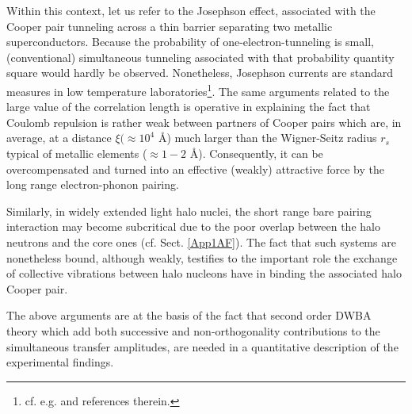 Within this context, let us refer to the Josephson effect, associated with the Cooper pair tunneling across a thin barrier separating two metallic superconductors. Because the probability of one-electron-tunneling is small, (conventional) simultaneous tunneling associated with that probability quantity square would hardly be observed. Nonetheless, Josephson currents are standard measures in low temperature laboratories\footnote{cf. e.g. \cite{Rogalla:12} and references therein.}.
The same arguments related  to the large value of the correlation length is operative in explaining the fact that Coulomb repulsion is rather weak between partners of Cooper pairs which are, in average, at a distance $\xi (\approx 10^{4}$ \AA{}) much larger than the Wigner-Seitz radius $r_s$ typical of metallic elements ($\approx 1-2$ \AA{}). Consequently, it can be overcompensated and turned into an effective (weakly) attractive force by the long range electron-phonon pairing. 


Similarly, in widely extended light halo nuclei, the short range bare pairing interaction may  become subcritical due to the poor overlap between the halo neutrons and the core ones (cf. Sect. \ref{App1AF}). The fact that such systems are nonetheless bound, although weakly, testifies to the important role the exchange of collective vibrations between halo nucleons have in binding the associated halo Cooper pair.


The above arguments are at the basis of the fact that second order DWBA theory which add both successive and non-orthogonality contributions to the simultaneous transfer amplitudes, are needed in a quantitative description of the experimental findings.

